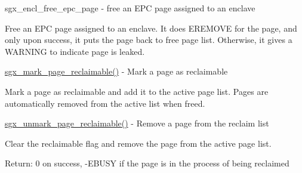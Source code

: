 sgx\+\_\+encl\+\_\+free\+\_\+epc\+\_\+page -\/ free an E\+PC page assigned to an enclave

Free an E\+PC page assigned to an enclave. It does E\+R\+E\+M\+O\+VE for the page, and only upon success, it puts the page back to free page list. Otherwise, it gives a W\+A\+R\+N\+I\+NG to indicate page is leaked.

\mbox{\hyperlink{arch_2x86_2kernel_2cpu_2sgx_2main_8c_a8684cf8e39dc2d713588d7b052a89b6d}{sgx\+\_\+mark\+\_\+page\+\_\+reclaimable()}} -\/ Mark a page as reclaimable

Mark a page as reclaimable and add it to the active page list. Pages are automatically removed from the active list when freed.

\mbox{\hyperlink{arch_2x86_2kernel_2cpu_2sgx_2main_8c_a0718d492762dcd77e0416d58fd897f56}{sgx\+\_\+unmark\+\_\+page\+\_\+reclaimable()}} -\/ Remove a page from the reclaim list

Clear the reclaimable flag and remove the page from the active page list.

Return\+: 0 on success, -\/E\+B\+U\+SY if the page is in the process of being reclaimed 